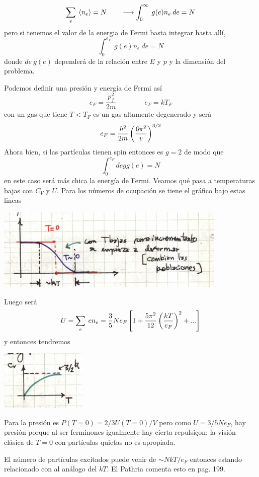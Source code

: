 \documentclass[10pt,oneside]{CBFT_book}
\begin{document}
\[
	 \sum_e \:\left\langle n_e \right\rangle = N \qquad \longrightarrow \int_0^\infty \: g(e) n_e \: de = N
\]
pero si tenemos el valor de la energia de Fermi basta integrar hasta allí,
\[
	\int_0^{e_F} \: g(e) n_e \: de = N
\]
donde $de \: g(e)$ dependerá de la relación entre $E$ y $p$ y la dimensión del problema.

Podemos definir una presión y energía de Fermi así
\[
	e_F = \frac{p_f^2}{2m} \qquad \qquad e_F = k T_F
\]
con un gas que tiene $ T < T_F $ es un gas altamente degenerado y será
\[
	e_F = \frac{ \hbar^2 }{ 2 m } \left( \frac{  6 \pi^2  }{  v  } \right)^{3/2}
\]
Ahora bien, si las partículas tienen spin entonces es $g=2$ de modo que
\[
	\int_0^{e_F} de g g(e) = N
\]
en este caso será más chica la energía de Fermi. 
Veamos qué pasa a temperaturas bajas con $C_V$ y $U$.
Para los números de ocupación se tiene el gráfico bajo estas lineas

\includegraphics[scale=0.5]{images/1606329581.jpg}

Luego será
\[
	U = \sum_e \: e n_e = \frac{3}{5} N e_F \left[ 1 + \frac{5\pi^2}{12}\left( \frac{ kT }{ e_F } \right)^2 + ... \right]
\]
y entonces tendremos

\includegraphics[scale=0.5]{images/1606329585.jpg}

Para la presión es $ P(T=0) = 2/3 U(T=0)/V$ pero como $ U = 3/5 N e_F $,
hay presión porque al ser ferminones igualmente hay cierta repulsiçon: la visión clásica de $T=0$ con
partículas quietas no es apropiada.

El número de partículas excitados puede venir de $ \sim N k T / e_F $ entonces estando relacionado
con al análogo del $kT$. El Pathria comenta esto en pag. 199.
\end{document}
